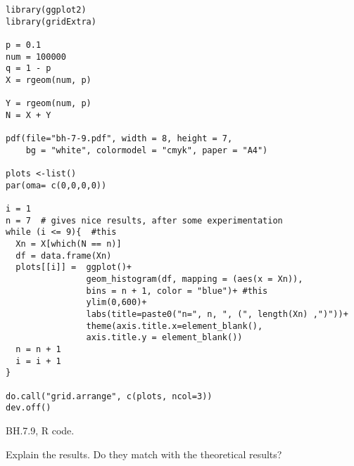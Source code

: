 \begin{listing}[!ht]
\begin{verbatim}
library(ggplot2)
library(gridExtra)

p = 0.1
num = 100000
q = 1 - p
X = rgeom(num, p)

Y = rgeom(num, p)
N = X + Y

pdf(file="bh-7-9.pdf", width = 8, height = 7, 
    bg = "white", colormodel = "cmyk", paper = "A4")          

plots <-list()
par(oma= c(0,0,0,0))

i = 1
n = 7  # gives nice results, after some experimentation
while (i <= 9){  #this
  Xn = X[which(N == n)]
  df = data.frame(Xn)
  plots[[i]] =  ggplot()+
                geom_histogram(df, mapping = (aes(x = Xn)), 
				bins = n + 1, color = "blue")+ #this
                ylim(0,600)+  
                labs(title=paste0("n=", n, ", (", length(Xn) ,")"))+
                theme(axis.title.x=element_blank(),
				axis.title.y = element_blank())
  n = n + 1
  i = i + 1
}

do.call("grid.arrange", c(plots, ncol=3))
dev.off()
\end{verbatim}
\caption{BH.7.9, R code.}
\label{BH.7.9.r}

\end{listing}

\begin{exercise}
Explain the results. Do they match with the theoretical results?
\end{exercise}
